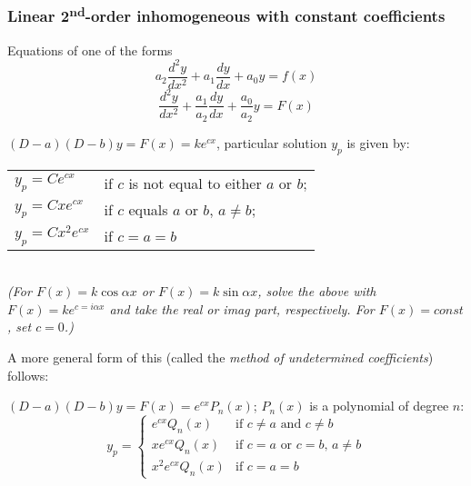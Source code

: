 \documentclass[letterpaper,landscape,10pt]{article}
\begin{document}
{\begin{multicols}{3}
		\subsubsection*{Linear 2\textsuperscript{nd}-order inhomogeneous
				with constant coefficients}
			Equations of one of the forms\\
			$$
				a_2 \frac{d^2y}{dx^2} + a_1 \frac{dy}{dx} + a_0y = f(x)
			$$
			$$
				\frac{d^2y}{dx^2} + \frac{a_1}{a_2} \frac{dy}{dx} +
					\frac{a_0}{a_2}y = F(x)
			$$
			\begin{center}
			$(D-a)(D-b)y=F(x)=ke^{cx}$, particular solution $y_p$ is given by:\\
			\begin{tabular}{ l l }
				$y_p=Ce^{cx}$ & if $c$ is not equal to either $a$ or $b$; \\
				$y_p=Cxe^{cx}$ & if $c$ equals $a$ or $b$, $a\neq b$;\\
				$y_p=Cx^2e^{cx}$ & if $c=a=b$ \\
			\end{tabular}\\
			\emph{(For $F(x)=k\cos\alpha x$ or $F(x)=k\sin\alpha x$, solve the
			above with $F(x)=ke^{c=i\alpha x}$ and take the real or imag part,
			respectively. For $F(x)=const$, set $c=0$.)}
			\end{center}
			A more general form of this (called the \emph{method of
			undetermined coefficients}) follows:\\
			\begin{center}
				$(D-a)(D-b)y=F(x)=e^{cx}P_n(x)$; $P_n(x)$ is a polynomial of
				degree $n$:
				\[
				y_p = 
				\begin{cases}
					   e^{cx}Q_n(x) & \text{if $c \neq a$ and $c \neq b$}\\
					  xe^{cx}Q_n(x) & \text{if $c=a$ or $c=b$, $a\neq b$}\\
					x^2e^{cx}Q_n(x) & \text{if $c=a=b$}
				\end{cases}
				\]
			\end{center}


\end{multicols}}
\end{document}
